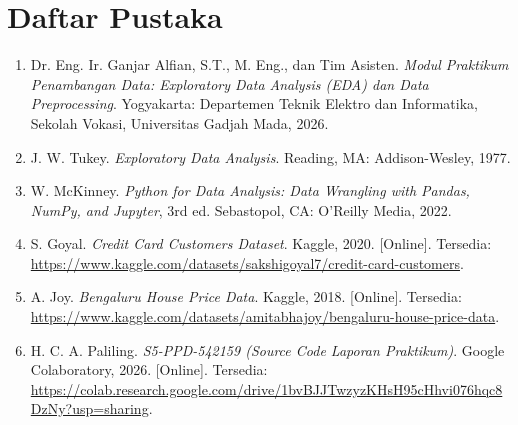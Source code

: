 \documentclass[a4paper,oneside,11pt]{book}
\begin{document}
\chapter{Daftar Pustaka}
\begin{enumerate}
    \item \label{modulPraktikum} Dr. Eng. Ir. Ganjar Alfian, S.T., M. Eng., dan Tim Asisten. \textit{Modul Praktikum Penambangan Data: Exploratory Data Analysis (EDA) dan Data Preprocessing}. Yogyakarta: Departemen Teknik Elektro dan Informatika, Sekolah Vokasi, Universitas Gadjah Mada, 2026.
    
    \item \label{tukey} J. W. Tukey. \textit{Exploratory Data Analysis}. Reading, MA: Addison-Wesley, 1977.
    
    \item \label{mckinney} W. McKinney. \textit{Python for Data Analysis: Data Wrangling with Pandas, NumPy, and Jupyter}, 3rd ed. Sebastopol, CA: O'Reilly Media, 2022.
    
    \item \label{kaggleCredit} S. Goyal. \textit{Credit Card Customers Dataset}. Kaggle, 2020. [Online]. Tersedia: \url{https://www.kaggle.com/datasets/sakshigoyal7/credit-card-customers}.
    
    \item \label{kaggleBengaluru} A. Joy. \textit{Bengaluru House Price Data}. Kaggle, 2018. [Online]. Tersedia: \url{https://www.kaggle.com/datasets/amitabhajoy/bengaluru-house-price-data}.
    
    \item \label{colabLaporan} H. C. A. Paliling. \textit{S5-PPD-542159 (Source Code Laporan Praktikum)}. Google Colaboratory, 2026. [Online]. Tersedia: \url{https://colab.research.google.com/drive/1bvBJJTwzyzKHsH95cHhvi076hqc8DzNy?usp=sharing}.
\end{enumerate}
\end{document}
